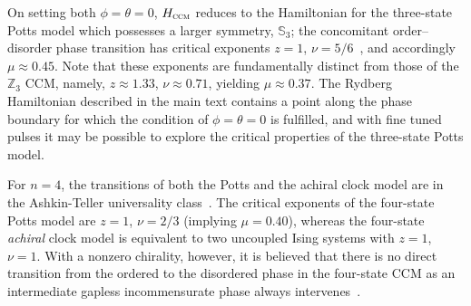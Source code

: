 \documentclass[prl,nobalancelastpage,superscriptaddress,twocolumn,nofootinbib]{revtex4}
\begin{document}
On setting both $\phi = \theta = 0$,  $H_{\textsc{ccm}}$ reduces to the Hamiltonian for the three-state Potts model which possesses a larger symmetry, $\mathbb{S}_3$; the concomitant order--disorder phase transition has critical exponents $z = 1$, $\nu = 5/6$~\cite{alexander1975lattice,baxter1980hard, wu1982potts}, and accordingly $\mu \approx 0.45$. Note that these exponents are fundamentally distinct from those of the $\mathbb{Z}_3$ CCM, namely, $z \approx 1.33$, $\nu \approx 0.71$, yielding $\mu \approx 0.37$. The Rydberg Hamiltonian described in the main text contains a point along the phase boundary for which the condition of $\phi = \theta = 0$ is fulfilled, and with fine tuned pulses it may be possible to explore the critical properties of the three-state Potts model.

For $n=4$, the transitions of both the Potts and the achiral clock model are in the Ashkin-Teller universality class~\cite{jose1977renormalization, kadanoff1977connections}. The critical exponents of the four-state Potts model are $z = 1$, $\nu = 2/3$ (implying $\mu = 0.40$), whereas the four-state \textit{achiral} clock model is equivalent to two uncoupled Ising systems with $z = 1$, $\nu = 1$. With a nonzero chirality, however, it is believed that there is no direct transition from the ordered to the disordered phase in the four-state CCM as an intermediate gapless incommensurate phase always intervenes~\cite{Ostlund1981,haldane1983phase, yeomans1984annni}.


\FloatBarrier
\renewcommand{\addcontentsline}[3]{}
\end{document}
